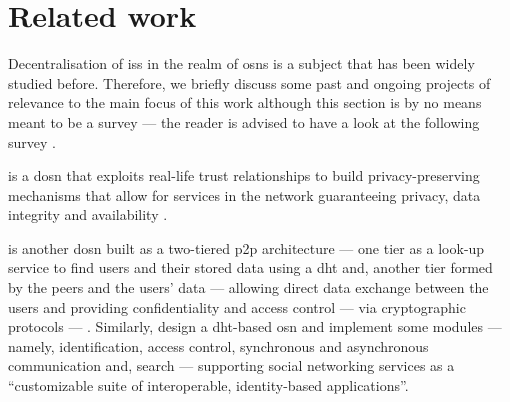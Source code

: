 
%
%
%
%

\section{Related work}
    \label{section:thesis:related-work}
Decentralisation of \acp{is} in the realm of \acp{osn} is a subject that has been 
widely studied before. Therefore, we briefly discuss some past and ongoing projects 
of relevance to the main focus of this work although this section is by no means 
meant to be a survey --- the reader is advised to have a look at the following 
survey \cite{PaulFS14}.

\Safebook is a \ac{dosn} that exploits real-life trust relationships to build privacy-preserving 
mechanisms that allow for services in the network guaranteeing privacy, data integrity 
and availability \cite{CutilloMS09}. 

\PeerSoN is another \ac{dosn} built as a two-tiered \ac{p2p} architecture --- one 
tier as a look-up service to find users and their stored data using a \ac{dht} and, 
another tier formed by the peers and the users' data --- allowing direct data exchange 
between the users and providing confidentiality and access control --- via cryptographic 
protocols --- \cite{BucheggerSVD09}. Similarly, \cite{AielloR10} design a \ac{dht}-based 
\ac{osn} and implement some modules --- namely, identification, access control, synchronous 
and asynchronous communication and, search --- supporting social networking services 
as a ``customizable suite of interoperable, identity-based applications''.


